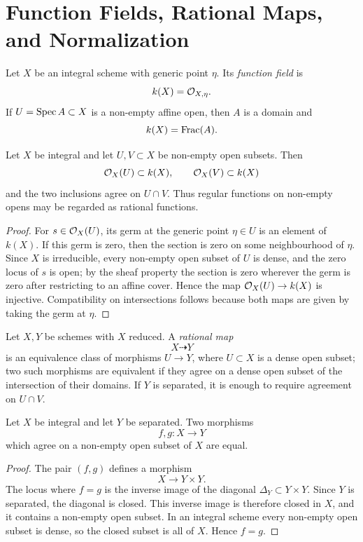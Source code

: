 \section{Function Fields, Rational Maps, and Normalization}

\begin{definition}
Let \(X\) be an integral scheme with generic point \(\eta\).  Its
\emph{function field} is
\[
    k(X)=\mathcal{O}_{X,\eta}.
\]
If \(U=\operatorname{Spec} A\subset X\) is a non-empty affine open, then \(A\) is a domain and
\[
    k(X)=\operatorname{Frac}(A).
\]
\end{definition}

\begin{proposition}
Let \(X\) be integral and let \(U,V\subset X\) be non-empty open subsets.  Then
\[
    \mathcal{O}_X(U)\subset k(X),\qquad \mathcal{O}_X(V)\subset k(X)
\]
and the two inclusions agree on \(U\cap V\).  Thus regular functions on
non-empty opens may be regarded as rational functions.
\end{proposition}

\begin{proof}
For \(s\in\mathcal{O}_X(U)\), its germ at the generic point \(\eta\in U\) is an element
of \(k(X)\).  If this germ is zero, then the section is zero on some
neighbourhood of \(\eta\).  Since \(X\) is irreducible, every non-empty open
subset of \(U\) is dense, and the zero locus of \(s\) is open; by the sheaf
property the section is zero wherever the germ is zero after restricting to an
affine cover.  Hence the map \(\mathcal{O}_X(U)\to k(X)\) is injective.  Compatibility
on intersections follows because both maps are given by taking the germ at
\(\eta\).
\end{proof}

\begin{definition}
Let \(X,Y\) be schemes with \(X\) reduced.  A \emph{rational map}
\[
    X\dashrightarrow Y
\]
is an equivalence class of morphisms \(U\to Y\), where \(U\subset X\) is a
dense open subset; two such morphisms are equivalent if they agree on a dense
open subset of the intersection of their domains.  If \(Y\) is separated, it is
enough to require agreement on \(U\cap V\).
\end{definition}

\begin{proposition}
Let \(X\) be integral and let \(Y\) be separated.  Two morphisms
\[
    f,g:X\to Y
\]
which agree on a non-empty open subset of \(X\) are equal.
\end{proposition}

\begin{proof}
The pair \((f,g)\) defines a morphism
\[
    X\to Y\times Y.
\]
The locus where \(f=g\) is the inverse image of the diagonal
\(\Delta_Y\subset Y\times Y\).  Since \(Y\) is separated, the diagonal is
closed.  This inverse image is therefore closed in \(X\), and it contains a
non-empty open subset.  In an integral scheme every non-empty open subset is
dense, so the closed subset is all of \(X\).  Hence \(f=g\).
\end{proof}

